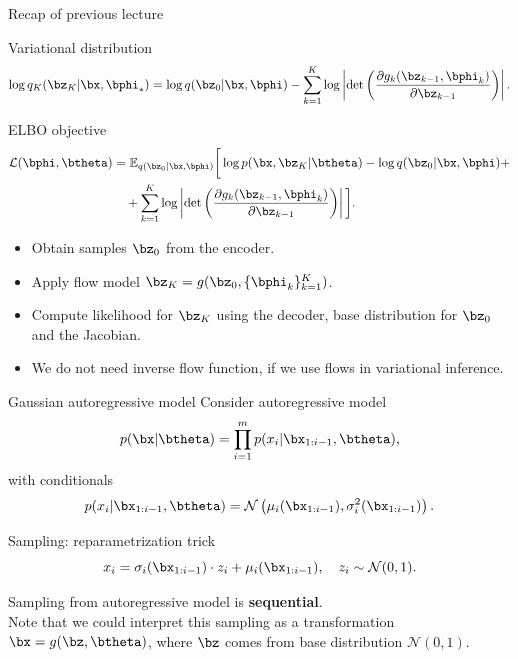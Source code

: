 \begin{frame}{Recap of previous lecture}
	\begin{block}{Variational distribution}
		\vspace{-0.6cm}
		\[
			\log q_K(\bz_K | \bx, \bphi_*) = \log q(\bz_0 | \bx, \bphi) - \sum_{k=1}^K \log \left| \det \left( \frac{\partial g_k(\bz_{k - 1}, \bphi_k)}{\partial \bz_{k-1}} \right) \right|.
		\]
		\vspace{-0.6cm}
	\end{block}
	\begin{block}{ELBO objective}
		\vspace{-0.7cm}
		\begin{align*}
			\mathcal{L} (\bphi, \btheta) 
			&= \mathbb{E}_{q(\bz_0 | \bx, \bphi)} \bigg[\log p(\bx, \bz_K | \btheta) -  \log q(\bz_0 | \bx, \bphi ) + \\ & \quad  + \sum_{k=1}^K \log \left| \det \left( \frac{\partial g_k(\bz_{k - 1}, \bphi_k)}{\partial \bz_{k-1}} \right) \right| \bigg].
		\end{align*}
		\vspace{-0.5cm}
	\end{block}
	\begin{itemize}
		\item Obtain samples $\bz_0$ from the encoder.
		\item Apply flow model $\bz_K = g(\bz_0, \{\bphi_k\}_{k = 1}^K)$.
		\item Compute likelihood for $\bz_K$ using the decoder, base distribution for $\bz_0$ and the Jacobian.
		\item We do not need inverse flow function, if we use flows in variational inference.
	\end{itemize}
\end{frame}
\begin{frame}{Gaussian autoregressive model}
	Consider autoregressive model
	\[
		p(\bx | \btheta) = \prod_{i=1}^m p(x_i | \bx_{1:i - 1}, \btheta),
	\]
	with conditionals
	\[
	p(x_i | \bx_{1:i - 1}, \btheta) = \mathcal{N} \left(\mu_i(\bx_{1:i-1}), \sigma^2_i (\bx_{1:i-1})\right).
	\]
	\vspace{-0.5cm}
	\begin{block}{Sampling: reparametrization trick}
		\[
		x_i = \sigma_i (\bx_{1:i-1}) \cdot z_i + \mu_i(\bx_{1:i-1}), \quad z_i \sim \mathcal{N}(0, 1).
		\]
	\end{block}
	Sampling from autoregressive model is \textbf{sequential}. \\
	Note that we could interpret this sampling as a transformation $\bx = g(\bz, \btheta)$, where $\bz$ comes from base distribution $\mathcal{N}(0, 1)$.
\end{frame}
